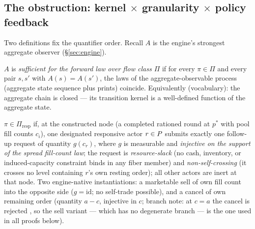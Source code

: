 
\subsection{The obstruction: kernel $\times$ granularity $\times$ policy
feedback}
\label{sec:t1-dynamic}

Two definitions fix the quantifier order. Recall $A$ is the engine's
strongest aggregate observer (\S\ref{sec:engine}).

\begin{definition}
\label{def:t1-suff}
$A$ is \emph{sufficient for the forward law over flow class $\Pi$} if for
every $\pi \in \Pi$ and every pair $s, s'$ with $A(s) = A(s')$, the laws of
the aggregate-observable process (aggregate state sequence plus prints)
coincide. Equivalently (vocabulary): the aggregate chain is closed --- its
transition kernel is a well-defined function of the aggregate state.
\end{definition}

\begin{definition}
\label{def:t1-piresp}
$\pi \in \Pi_{\mathrm{resp}}$ if, at the constructed node (a completed
rationed round at $p^{*}$ with pool fill counts $c_i$), one designated
responsive actor $r \in P$ submits exactly one follow-up request of
quantity $g(c_r)$, where $g$ is measurable and \emph{injective on the
support of the spread fill-count law}; the request is \emph{resource-slack}
(no cash, inventory, or induced-capacity constraint binds in any fiber
member) and \emph{non-self-crossing} (it crosses no level containing $r$'s
own resting order); all other actors are inert at that node. Two
engine-native instantiations: a marketable sell of own fill count into the
opposite side ($g = \mathrm{id}$; no self-trade possible), and a cancel of
own remaining order (quantity $a - c$, injective in $c$; branch note: at $c =
a$ the cancel is rejected , so the sell variant --- which
has no degenerate branch --- is the one used in all proofs below).
\end{definition}

